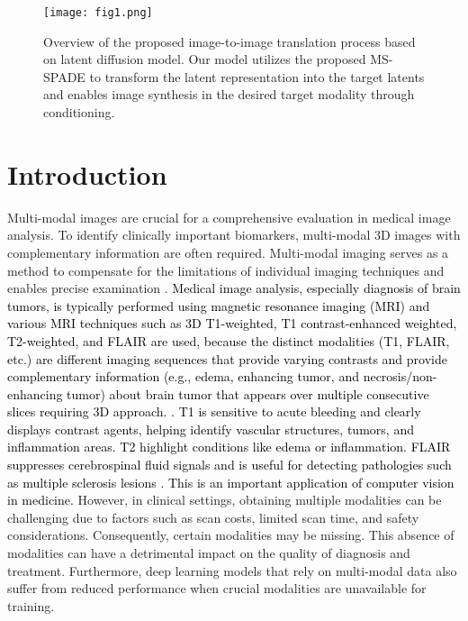 \documentclass[10pt,twocolumn,letterpaper]{article}
\newcommand{\jhk}[2]{\textcolor{black}{{}#2}}
\begin{document}
\begin{figure} [t]
    \texttt{[image: fig1.png]}
    \caption{Overview of the proposed image-to-image translation process based on latent diffusion model. Our model utilizes the proposed MS-SPADE to transform the latent representation into the target latents and enables image synthesis in the desired target modality through conditioning.} 
    \label{fig1}
    \vspace{-12pt}
\end{figure}

\section{Introduction}

Multi-modal images are crucial for a comprehensive evaluation in medical image analysis. To identify clinically important biomarkers, multi-modal 3D images with complementary information are often required. Multi-modal imaging serves as a method to compensate for the limitations of individual imaging techniques and enables precise examination \cite{liu2018digital, shen2019brain, tong2017multi}. \jhk{}{Medical image analysis, especially diagnosis of brain tumors, is typically performed using magnetic resonance imaging (MRI) and various MRI techniques such as 3D T1-weighted, T1 contrast-enhanced weighted, T2-weighted, and FLAIR are used, because the distinct modalities (T1, FLAIR, etc.) are different imaging sequences that provide varying contrasts and provide complementary information (e.g., edema, enhancing tumor, and necrosis/non-enhancing tumor) about brain tumor that appears over multiple consecutive slices requiring 3D approach. \cite{menze2014multimodal, bakas2017advancing,bakas2017segmentation}. T1 is sensitive to acute bleeding and clearly displays contrast agents, helping identify vascular structures, tumors, and inflammation areas. T2 highlight conditions like edema or inflammation. FLAIR suppresses cerebrospinal fluid signals and is useful for detecting pathologies such as multiple sclerosis lesions \cite{menze2014multimodal, bakas2017advancing, patel2017t2, shukla2017advanced}.
This is an important application of computer vision in medicine.} However, in clinical settings, obtaining multiple modalities can be challenging due to factors such as scan costs, limited scan time, and safety considerations. Consequently, certain modalities may be missing. This absence of modalities can have a detrimental impact on the quality of diagnosis and treatment. Furthermore, deep learning models that rely on multi-modal data also suffer from reduced performance when crucial modalities are unavailable for training.
\end{document}
